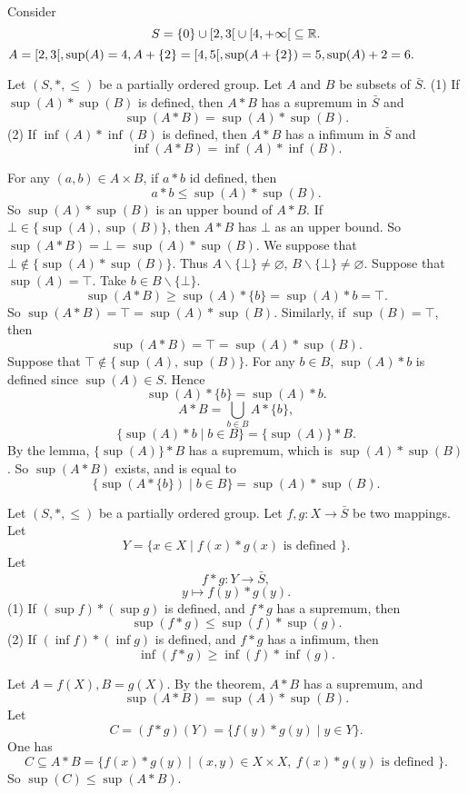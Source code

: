 \begin{remark}
    Consider
    $$S=\{0\}\cup\interval[open right]{2}{3}\cup\interval[open right ]{4}{+\infty}\subseteq \RR.$$ 
    $A=\interval[open right]{2}{3}, \sup(A)=4, A+\{2\}=\interval[open right]{4}{5}, \sup(A+\{2\})=5, \sup(A)+2=6.$
\end{remark}
\begin{theoremenv}
    Let $(S,*,\le)$ be a partially ordered group. Let $A$ and $B$ be subsets of $\bar{S}$.
    \newline
    (1) If $\sup(A)*\sup(B)$ is defined, then $A*B$ has a supremum in $\bar{S}$ and
    $$\sup(A*B)=\sup(A)*\sup(B).$$
    (2) If $\inf(A)*\inf(B)$ is defined, then $A*B$ has a infimum in $\bar{S}$ and
    $$\inf(A*B)=\inf(A)*\inf(B).$$
\end{theoremenv}
\begin{proofenv}
    For any $(a,b)\in A\times B$, if $a*b$ id defined, then 
    $$a*b\le \sup(A)*\sup(B).$$
    So $\sup(A)*\sup(B)$ is an upper bound of $A*B$. If $\bot\in \{\sup(A),\sup(B)\}$, then $A*B$ has $\bot$ as an upper bound. So $\sup(A*B)=\bot=\sup(A)*\sup(B)$. We suppose that $\bot\notin \{\sup(A)*\sup(B)\}$. Thus $A\backslash\{\bot\}\not=\varnothing$, $B\backslash\{\bot\}\not=\varnothing$. Suppose that $\sup(A)=\top$. Take $b\in B\backslash\{\bot\}$.
    \[\sup(A*B)\ge\sup(A)*\{b\}=\sup(A)*b=\top.\]
    So $\sup(A*B)=\top=\sup(A)*\sup(B)$. Similarly, if $\sup(B)=\top$, then 
    $$\sup(A*B)=\top=\sup(A)*\sup(B).$$
    Suppose that $\top\notin\{\sup (A),\sup (B)\}$. For any $b\in B$, $\sup(A)*b$ is defined since $\sup(A)\in S$. Hence
    $$\sup(A)*\{b\}=\sup(A)*b.$$
    $$A*B=\bigcup_{b\in B}A*\{b\},$$
    $$\{\sup(A)*b\mid b\in B\}=\{\sup(A)\}*B.$$
    By the lemma, $\{\sup(A)\}*B$ has a supremum, which is $\sup(A)*\sup(B)$. So $\sup(A*B)$ exists, and is equal to 
    $$\{\sup(A*\{b\})\mid b\in B\}=\sup(A)*\sup(B).$$
\end{proofenv}
\begin{corollaryenv}
    Let $(S,*,\le)$ be a partially ordered group. Let $f,g: X\longrightarrow \bar{S}$ be two mappings. Let 
    $$Y=\{x\in X\mid f(x)*g(x) \text{ is defined }\}.$$
    Let $$f*g: Y\longrightarrow \bar{S},$$
    $$y\longmapsto f(y)*g(y).$$
    (1) If $(\sup f)*(\sup g)$ is defined, and $f*g$ has a supremum, then $$\sup(f*g)\le \sup(f)*\sup(g).$$
    (2) If $(\inf f)*(\inf g)$ is defined, and $f*g$ has a infimum, then $$\inf(f*g)\ge \inf(f)*\inf(g).$$
\end{corollaryenv}
\begin{proofenv}
    Let $A=f(X), B=g(X)$. By the theorem, $A*B$ has a supremum, and 
    $$\sup(A*B)=\sup(A)*\sup(B).$$
    Let $$C=(f*g)(Y)=\{f(y)*g(y)\mid y\in Y\}.$$
    One has 
    $$C\subseteq A*B=\{f(x)*g(y)\mid (x,y)\in X\times X,\  f(x)*g(y)\text{ is defined }\}.$$
    So $\sup(C)\le \sup(A*B).$
\end{proofenv}
